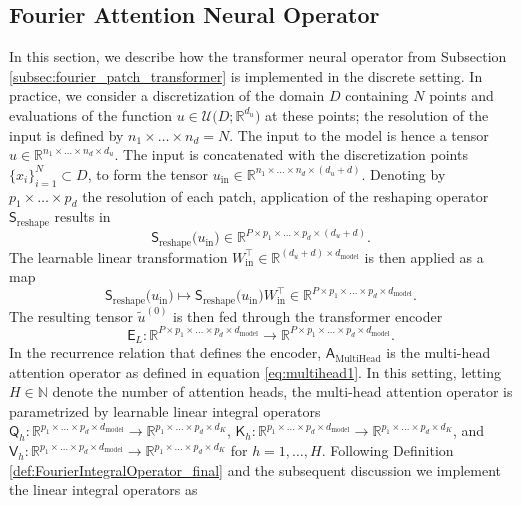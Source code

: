 \documentclass[twoside]{article}
\newcommand{\1}{\mathbbm{1}}
\newcommand{\R}{\mathbbm{R}}
\newcommand{\N}{\mathbbm{N}}
\newcommand{\cU}{\mathcal{U}}
\newcommand{\sA}{\mathsf{A}}
\newcommand{\sQ}{\mathsf{Q}}
\newcommand{\sK}{\mathsf{K}}
\newcommand{\sE}{\mathsf{E}}
\newcommand{\sS}{\mathsf{S}}
\newcommand{\sV}{\mathsf{V}}
\providecommand{\mathbbm}{\mathbb} %
\begin{document}

\subsection{Fourier Attention Neural Operator}
\label{subsubsec:patch_transformer_implement}
In this section, we describe how the transformer neural operator from Subsection \ref{subsec:fourier_patch_transformer} is implemented in the discrete setting. In practice, we consider a discretization of the domain $D$ containing $N$ points and evaluations of the function $u\in\cU\bigl(D;\R^{d_u} \bigr)$ at these points; the resolution of the input is defined by $n_1\times\ldots\times n_d=N$. The input to the model is hence a tensor $u\in \R^{n_1\times\ldots\times n_d\times d_u}$. The input is concatenated with the discretization points $\{x_i\}_{i=1}^N\subset D$, to form the tensor $u_{\textrm{in}}\in \R^{n_1\times\ldots\times n_d\times (d_u+d)}$. Denoting by $p_1\times\ldots\times p_d$ the resolution of each patch, application of the reshaping operator $\sS_{\textrm{reshape}}$ results in $$\sS_{\textrm{reshape}}\bigl(u_{\textrm{in}} \bigr)\in \R^{P\times p_1 \times\ldots\times p_d \times (d_u+d)}.$$
The learnable linear transformation $W_{\textrm{in}}^\top\in \R^{(d_u+d)\times d_\textrm{model}}$ is then applied as a map
$$\sS_{\textrm{reshape}}\bigl(u_{\textrm{in}} \bigr)\mapsto \sS_{\textrm{reshape}}\bigl(u_{\textrm{in}} \bigr)W_{\textrm{in}}^\top \in \R^{P\times p_1 \times\ldots\times p_d \times d_{\textrm{model}}}.$$
The resulting tensor $\widetilde{u}^{(0)}$ is then fed through the transformer encoder $$\sE_L:\R^{{P\times p_1\times \ldots\times p_d\times d_{\textrm{model}}}}\to\R^{{P\times p_1\times \ldots\times p_d\times d_{\textrm{model}}}}.$$ 
In the recurrence relation that defines the encoder, $\sA_{\textrm{MultiHead}}$ is the multi-head attention operator as defined in equation \eqref{eq:multihead1}. In this setting, letting $H\in \N$ denote the number of attention heads, the multi-head attention operator is parametrized by learnable linear integral operators $\sQ_h:\R^{p_1\times\ldots\times p_d\times d_\textrm{model}}\to \R^{p_1\times\ldots\times p_d\times d_K}$, $\sK_h: \R^{p_1\times\ldots\times p_d\times d_\textrm{model}}\to \R^{ p_1\times\ldots\times p_d\times d_K}$, and $\sV_h: \R^{p_1\times\ldots\times p_d\times d_\textrm{model}}\to \R^{ p_1\times\ldots\times p_d\times d_K}$ for $h=1,\ldots, H$. Following Definition \ref{def:FourierIntegralOperator_final} and the subsequent discussion we implement the linear integral operators as 
\end{document}
